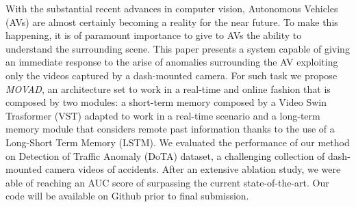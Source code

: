 With the substantial recent advances in computer vision, Autonomous Vehicles (AVs) are almost certainly becoming a reality for the near future.
To make this happening, it is of paramount importance to give to AVs the ability to understand the surrounding scene.
This paper presents a system capable of giving an immediate response to the arise of anomalies surrounding the AV exploiting only the videos captured by a dash-mounted camera.
For such task we propose \emph{MOVAD}, an architecture set to work in a real-time and online fashion that is composed by two modules: a short-term memory composed by a Video Swin Trasformer (VST) adapted to work in a real-time scenario and a long-term memory module that considers remote past information thanks to the use of a Long-Short Term Memory (LSTM).
We evaluated the performance of our method on Detection of Traffic Anomaly (DoTA) dataset, a challenging collection of dash-mounted camera videos of accidents.
After an extensive ablation study, we were able of reaching an AUC score of  surpassing the current state-of-the-art.
Our code will be available on Github prior to final submission.